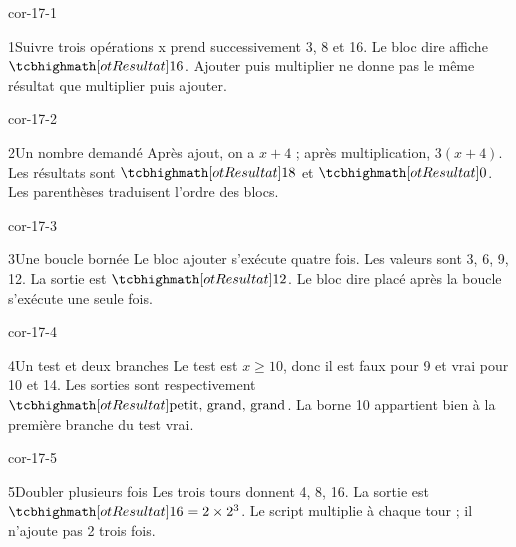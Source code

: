 \clearpage\pagestyle{otMain}\fontsize{11}{15}\selectfont{}
\begin{blocLivre}{cor-17-1}\begin{corrige}{1}{Suivre trois opérations}
x prend successivement 3, 8 et 16. Le bloc dire affiche $\res{16}$. Ajouter puis multiplier ne donne pas le même résultat que multiplier puis ajouter.
\label{fig-cor-17-1}
\end{corrige}\end{blocLivre}
\begin{blocLivre}{cor-17-2}\begin{corrige}{2}{Un nombre demandé}
Après ajout, on a $x+4$ ; après multiplication, $3(x+4)$. Les résultats sont $\res{18}$ et $\res0$. Les parenthèses traduisent l’ordre des blocs.
\label{fig-cor-17-2}
\end{corrige}\end{blocLivre}
\begin{blocLivre}{cor-17-3}\begin{corrige}{3}{Une boucle bornée}
Le bloc ajouter s’exécute quatre fois. Les valeurs sont 3, 6, 9, 12. La sortie est $\res{12}$. Le bloc dire placé après la boucle s’exécute une seule fois.
\label{fig-cor-17-3}
\end{corrige}\end{blocLivre}
\begin{blocLivre}{cor-17-4}\begin{corrige}{4}{Un test et deux branches}
Le test est $x\ge10$, donc il est faux pour 9 et vrai pour 10 et 14. Les sorties sont respectivement $\res{\text{petit, grand, grand}}$. La borne 10 appartient bien à la première branche du test vrai.
\label{fig-cor-17-4}
\end{corrige}\end{blocLivre}
\begin{blocLivre}{cor-17-5}\begin{corrige}{5}{Doubler plusieurs fois}
Les trois tours donnent 4, 8, 16. La sortie est $\res{16=2\times2^3}$. Le script multiplie à chaque tour ; il n’ajoute pas 2 trois fois.
\label{fig-cor-17-5}
\end{corrige}\end{blocLivre}
